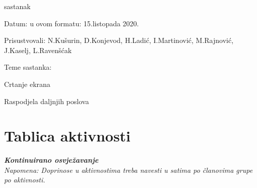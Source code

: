 \begin{packed_enum}
	\item sastanak
	\item[] \begin{packed_item}
		\item Datum: u ovom formatu: 15.listopada 2020.
		\item Prisustvovali: N.Kušurin, D.Konjevod, H.Ladić, I.Martinović, M.Rajnović, J.Kaselj, L.Ravenšćak
		\item Teme sastanka: 
		\begin{packed_item}
			\item   Crtanje ekrana
			\item 	Raspodjela daljnjih poslova
		\end{packed_item}
	\end{packed_item}
			
			
		\end{packed_enum}
		
		\eject
		\section*{Tablica aktivnosti}
		
			\textbf{\textit{Kontinuirano osvježavanje}}\\
			
			 \textit{Napomena: Doprinose u aktivnostima treba navesti u satima po članovima grupe po aktivnosti.}
					
						
			
